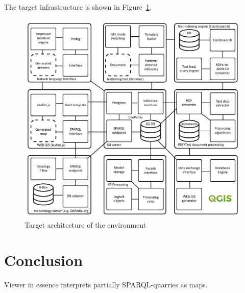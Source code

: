 \documentclass[
]{ceurart}
\begin{document}
The target infrastructure is shown in Figure~\ref{fig:target}.
\begin{figure}
  \centering
  \includegraphics[width=0.8\linewidth]{architecture.pdf}
  \caption{Target architecture of the environment}
  \label{fig:target}
\end{figure}


\section*{Conclusion}

Viewer in essence interprets partially SPARQL-quarries as maps.

\begin{acknowledgments}

\end{acknowledgments}

% 
\end{document}
